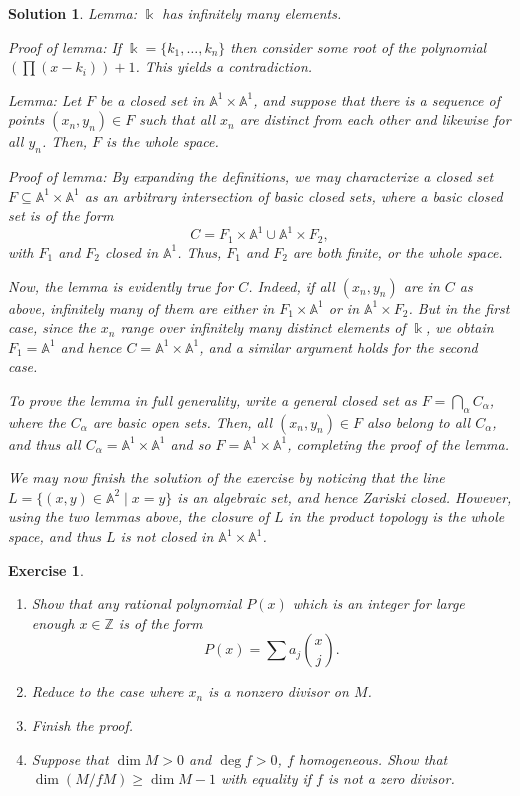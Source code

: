\documentclass{article}
\newtheorem{ex}{Exercise}
\theoremstyle{nonumberplain}
\newtheorem{sol}{Solution}
\newcommand{\Z}{\mathbb{Z}}
\newcommand{\kk}{\Bbbk}
\newcommand{\Aff}{\mathbb{A}}
\begin{document}
\begin{sol}
Lemma: $\kk$ has infinitely many elements.

Proof of lemma: If $\kk = \{k_1, \dots, k_n\}$ then consider some root of the polynomial $\left(\prod (x - k_i) \right) + 1$. This yields a contradiction.

\smallskip

Lemma: Let $F$ be a closed set in $\Aff^1 \times \Aff^1$, and suppose that there is a sequence of points $(x_n, y_n) \in F$ such that all $x_n$ are distinct from each other and likewise for all $y_n$. Then, $F$ is the whole space.

Proof of lemma: By expanding the definitions, we may characterize a closed set $F \subseteq \Aff^1 \times \Aff^1$ as an arbitrary intersection of basic closed sets, where a basic closed set is of the form
\begin{equation}
C = F_1 \times \Aff^1 \cup \Aff^1 \times F_2,
\end{equation}
with $F_1$ and $F_2$ closed in $\Aff^1$. Thus, $F_1$ and $F_2$ are both finite, or the whole space.

Now, the lemma is evidently true for $C$. Indeed, if all $(x_n, y_n)$ are in $C$ as above, infinitely many of them are either in $F_1 \times \Aff^1$ or in $\Aff^1 \times F_2$. But in the first case, since the $x_n$ range over infinitely many distinct elements of $\kk$, we obtain $F_1 = \Aff^1$ and hence $C = \Aff^1 \times \Aff^1$, and a similar argument holds for the second case.

To prove the lemma in full generality, write a general closed set as $F = \bigcap_{\alpha} C_\alpha$, where the $C_\alpha$ are basic open sets. Then, all $(x_n, y_n) \in F$ also belong to all $C_\alpha$, and thus all $C_\alpha = \Aff^1 \times \Aff^1$ and so $F = \Aff^1 \times \Aff^1$, completing the proof of the lemma.

\smallskip

We may now finish the solution of the exercise by noticing that the line $L = \{(x,y) \in \Aff^2 \mid x=y\}$ is an algebraic set, and hence Zariski closed. However, using the two lemmas above, the closure of $L$ in the product topology is the whole space, and thus $L$ is not closed in $\Aff^1 \times \Aff^1$.
\end{sol}

\begin{ex}
\begin{enumerate}
\item Show that any rational polynomial $P(x)$ which is an integer for large enough $x \in \Z$ is of the form
\begin{equation}
P(x) = \sum a_j \binom x j.
\end{equation}
\item Reduce to the case where $x_n$ is a nonzero divisor on $M$.
\item Finish the proof.
\item Suppose that $\dim M > 0$ and $\deg f > 0$, $f$ homogeneous. Show that $\dim(M/fM) \geq \dim M - 1$ with equality if $f$ is not a zero divisor.
\end{enumerate}
\end{ex}
\end{document}
